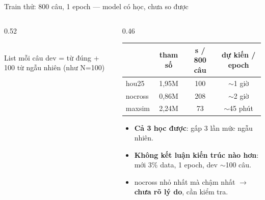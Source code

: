 \documentclass[aspectratio=169,xcolor=table]{beamer}
\newcommand{\bad}[1]{\textcolor{RiskRed}{\textbf{#1}}}
\newcommand{\good}[1]{\textcolor{GoodGreen}{\textbf{#1}}}
\begin{document}
\begin{frame}{Train thử: 800 câu, 1 epoch --- model có học, chưa so được}
\begin{columns}[T]
\begin{column}{0.52\textwidth}
\centering
{}\\
{\scriptsize List mỗi câu dev = từ đúng + 100 từ ngẫu nhiên (như N=100)}
\end{column}
\begin{column}{0.46\textwidth}
\footnotesize
\renewcommand{\arraystretch}{1.15}
\begin{tabular}{@{}lccc@{}}
\toprule
& tham số & s / 800 câu & dự kiến / epoch\\
\midrule
hou25 & 1,95M & 100 & $\sim$1 giờ\\
nocross & 0,86M & 208 & $\sim$2 giờ\\
maxsim & 2,24M & 73 & $\sim$45 phút\\
\bottomrule
\end{tabular}
\vspace{0.25cm}
\begin{itemize}\itemsep3pt
\item \good{Cả 3 học được}: gấp 3 lần mức ngẫu nhiên.
\item \bad{Không kết luận kiến trúc nào hơn}: mới 3\% data, 1 epoch, dev $\sim$100 câu.
\item nocross nhỏ nhất mà chậm nhất $\rightarrow$ \textbf{chưa rõ lý do}, cần kiểm tra.
\end{itemize}
\end{column}
\end{columns}
\end{frame}
\end{document}
